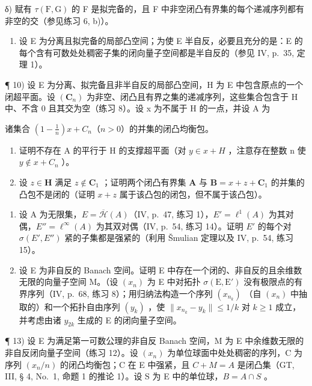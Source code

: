 δ) 赋有 \(\tau(\mathrm{F},\mathrm{G})\) 的 F 是拟完备的，且 F 中非空闭凸有界集的每个递减序列都有非空的交（参见练习 6, b)）。

\begin{enumerate}
\def\labelenumi{\arabic{enumi})}
\setcounter{enumi}{8}
\tightlist
\item
  设 E 为分离且拟完备的局部凸空间；为使 E 半自反，必要且充分的是：E 的每个含有可数处处稠密子集的闭向量子空间都是半自反的（参见 IV, p.~35, 定理 1）。
\end{enumerate}

¶ 10) 设 E 为分离、拟完备且非半自反的局部凸空间，H 为 E 中包含原点的一个闭超平面。设 \((\mathbf{C}_{n})\) 为非空、闭凸且有界之集的递减序列，这些集合包含于 H 中、不含 0 且其交为空（练习 8）。设 x 为不属于 H 的一点，并设 A 为

诸集合 \(\left(1 - \frac{1}{n}\right)x + C_n\)（\(n > 0\)）的并集的闭凸均衡包。

\begin{enumerate}
\def\labelenumi{\alph{enumi})}
\item
  证明不存在 A 的平行于 H 的支撑超平面（对 \(y \in x + H\) ，注意存在整数 n 使 \(y \notin x + C_{n}\) ）。
\item
  设 \(z \in \mathbf{H}\) 满足 \(z \notin \mathbf{C}_1\) ；证明两个闭凸有界集 \(\mathbf{A}\) 与 \(\mathbf{B} = x + z + \mathbf{C}_1\) 的并集的凸包不是闭的（证明 \(x + z\) 属于该凸包的闭包，但不属于该凸包）。
\end{enumerate}

\begin{enumerate}
\def\labelenumi{\arabic{enumi})}
\setcounter{enumi}{10}
\item
  设 A 为无限集，\(E = \overline{\mathcal{H}}(A)\)（IV, p.~47, 练习 1），\(E' = \ell^{1}(A)\) 为其对偶，\(E'' = \ell^{\infty}(A)\) 为其双对偶（IV, p.~54, 练习 14）。证明 \(E'\) 的每个对 \(\sigma(E', E'')\) 紧的子集都是强紧的（利用 Šmulian 定理以及 IV, p.~54, 练习 15）。
\item
  设 E 为非自反的 Banach 空间。证明 E 中存在一个闭的、非自反的且余维数无限的向量子空间 M。（设 \((x_{n})\) 为 E 中对拓扑 \(\sigma(\mathrm{E},\mathrm{E}')\) 没有极限点的有界序列（IV, p.~68, 练习 8）；用归纳法构造一个序列 \((x_{n_{k}})\) （自 \((x_{n})\) 中抽取的）和一个拓扑自由序列 \((y_{k})\) ，使 \(\| x_{n_{k}} - y_{k} \| \leqslant 1/k\) 对 \(k \geqslant 1\) 成立，并考虑由诸 \(y_{2k}\) 生成的 E 的闭向量子空间。
\end{enumerate}

¶ 13) 设 E 为满足第一可数公理的非自反 Banach 空间，M 为 E 中余维数无限的非自反闭向量子空间（练习 12）。设 \((x_{n})\) 为单位球面中处处稠密的序列，C 为序列 \((x_{n}/n)\) 的闭凸均衡包；C 在 E 中强紧，且 \(C + M = A\) 是闭凸集（GT, III, § 4, No.~1, 命题 1 的推论 1）。设 S 为 E 中的单位球，\(B = A \cap S\) 。


